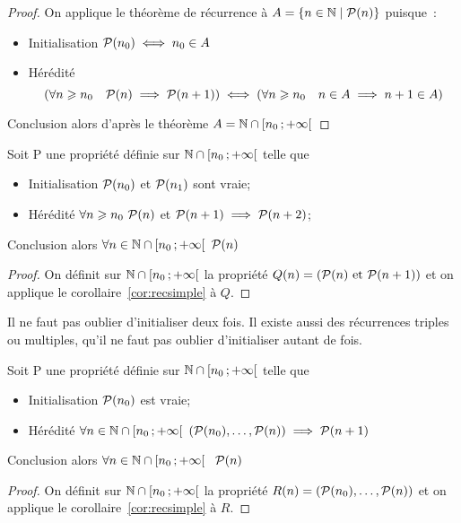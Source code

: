 \begin{proof}
  On applique le théorème de récurrence à $A=\enstq{n\in\N}{\P(n)}$ puisque~:
  \begin{itemize}
  \item Initialisation $\P(n_0) \iff n_0 \in A$
  \item Hérédité
    \begin{equation}
      \left(\forall n\geqslant n_0 \quad \P(n) \implies \P(n+1)\right) \iff \left( \forall n \geqslant n_0 \quad n\in A \implies n+1\in A\right)
    \end{equation}
  \end{itemize}
  Conclusion alors d'après le théorème $A=\N\cap \intervallefo{n_0}{+\infty}$
\end{proof}
\begin{cor}
  \label{cor:recdouble}
  Soit P une propriété définie sur $\N\cap \intervallefo{n_0}{+\infty}$ telle que
 \begin{itemize}
  \item Initialisation $\P(n_0)$ et $\P(n_1)$ sont vraie;
  \item Hérédité $\forall n\geqslant n_0 \ \P(n)$ et $\P(n+1) \implies \P(n+2)$;
  \end{itemize}
  Conclusion alors $\forall n \in \N\cap \intervallefo{n_0}{+\infty} \ \P(n)$ 
\end{cor}
\begin{proof}
  On définit sur $\N\cap \intervallefo{n_0}{+\infty}$ la propriété $Q(n)=(\P(n) \text{ et } \P(n+1))$ et on applique le corollaire~\ref{cor:recsimple} à $Q$.
\end{proof}
Il ne faut pas oublier d'initialiser deux fois. Il existe aussi des récurrences triples ou multiples, qu'il ne faut pas oublier d'initialiser autant de fois.
\begin{cor}
  \label{cor:recforte}
  Soit P une propriété définie sur $\N\cap \intervallefo{n_0}{+\infty}$ telle que
  \begin{itemize}
  \item Initialisation $\P(n_0)$ est vraie;
  \item Hérédité $\forall n \in \N\cap \intervallefo{n_0}{+\infty} \ (\P(n_0), \ldots, \P(n)) \implies \P(n+1)$
  \end{itemize}
  Conclusion alors $\forall n \in \N\cap \intervallefo{n_0}{+\infty}\ \ \P(n)$
\end{cor}
\begin{proof}
  On définit sur $\N\cap \intervallefo{n_0}{+\infty}$ la propriété $R(n)=(\P(n_0), \ldots, \P(n))$ et on applique le corollaire~\ref{cor:recsimple} à $R$.
\end{proof}

